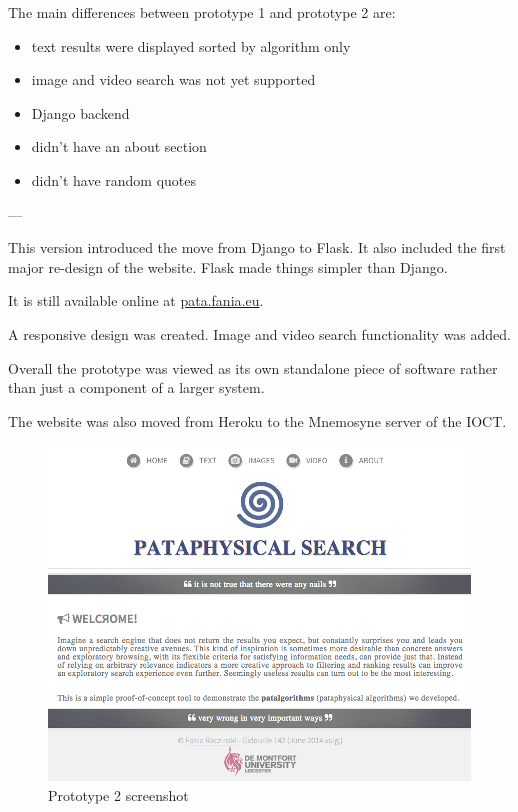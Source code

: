 The main differences between prototype 1 and prototype 2 are:
\begin{itemize}
  \item text results were displayed sorted by algorithm only
  \item image and video search was not yet supported
  \item Django backend
  \item didn't have an about section
  \item didn't have random quotes
\end{itemize}

---

This version introduced the move from Django to Flask. It also included the first major re-design of the website. Flask made things simpler than Django.

It is still available online at \url{pata.fania.eu}.

A responsive design was created.
Image and video search functionality was added.

Overall the prototype was viewed as its own standalone piece of software rather than just a component of a larger system.

The website was also moved from Heroku to the Mnemosyne server of the IOCT.

\begin{figure}[htbp] %
  \centering
  \includegraphics[width=0.6\linewidth]{images/prototype02}
\caption[Prototype 2 screenshot]{Prototype 2 screenshot}
\label{img:Prototype2x}
\end{figure}

